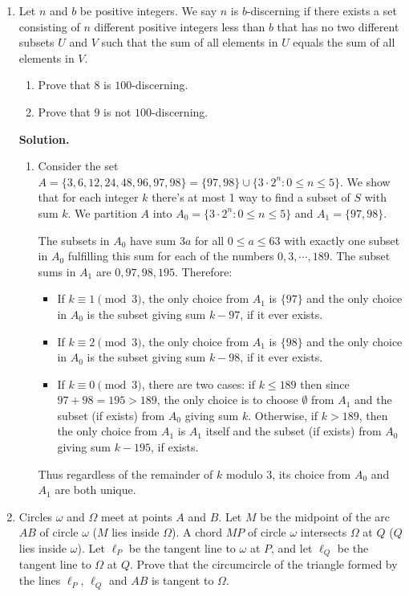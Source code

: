 \documentclass[11pt,a4paper]{article}
\begin{document}
\begin{enumerate}
	\item Let $n$ and $b$ be positive integers. We say $n$ is $b$-discerning if there exists a set consisting of $n$ different positive integers less than $b$ that has no two different subsets $U$ and $V$ such that the sum of all elements in $U$ equals the sum of all elements in $V$.
	
	\begin{enumerate}
		\item Prove that $8$ is $100$-discerning.
		\item Prove that $9$ is not $100$-discerning.
	\end{enumerate}
	
	\textbf{Solution.} 
	\begin{enumerate}
		\item Consider the set $A=\{3, 6, 12, 24, 48, 96, 97, 98\}=\{97, 98\}\cup \{3\cdot 2^n: 0\le n\le 5\}$. We show that for each integer $k$ there's at most 1 way to find a subset of $S$ with sum $k$. 
		We partition $A$ into $A_0=\{3\cdot 2^n: 0\le n\le 5\}$ and $A_1=\{97, 98\}$. 
		
		The subsets in $A_0$ have sum $3a$ for all $0\le a\le 63$ with exactly one subset in $A_0$ fulfilling this sum for each of the numbers $0, 3, \cdots , 189$. The subset sums in $A_1$ are $0, 97, 98, 195$. Therefore: 
		\begin{itemize}
			\item If $k\equiv 1\pmod{3}$, the only choice from $A_1$ is $\{97\}$ and the only choice in $A_0$ is the subset giving sum $k-97$, if it ever exists. 
			
			\item If $k\equiv 2\pmod{3}$, the only choice from $A_1$ is $\{98\}$ and the only choice in $A_0$ is the subset giving sum $k-98$, if it ever exists. 
			
			\item If $k\equiv 0\pmod{3}$, there are two cases: if $k\le 189$ then since $97+98=195>189$, the only choice is to choose $\emptyset$ from $A_1$ and the subset (if exists) from $A_0$ giving sum $k$. Otherwise, if $k>189$, then the only choice from $A_1$ is $A_1$ itself and the subset (if exists) from $A_0$ giving sum $k-195$, if exists. 
		\end{itemize}
		Thus regardless of the remainder of $k$ modulo 3, its choice from $A_0$ and $A_1$ are both unique. 
	\end{enumerate}

	\item Circles $\omega$ and $\Omega$ meet at points $A$ and $B$. Let $M$ be the midpoint of the arc $AB$ of circle $\omega$ ($M$ lies inside $\Omega$). A chord $MP$ of circle $\omega$ intersects $\Omega$ at $Q$ ($Q$ lies inside $\omega$). Let $\ell_P$ be the tangent line to $\omega$ at $P$, and let $\ell_Q$ be the tangent line to $\Omega$ at $Q$. Prove that the circumcircle of the triangle formed by the lines $\ell_P$, $\ell_Q$ and $AB$ is tangent to $\Omega$.
	

\end{enumerate}
\end{document}
